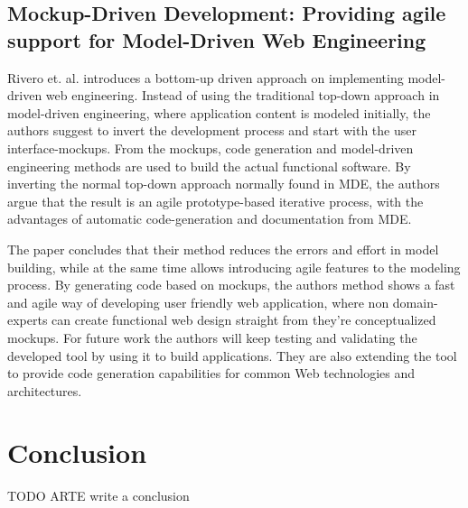 \documentclass[10pt, a4paper, twocolumn]{article}
\begin{document}
\subsection{Mockup-Driven Development: Providing agile support for Model-Driven Web Engineering}

Rivero et. al. \cite{RIVERO2014670} introduces a bottom-up driven approach on implementing model-driven web engineering. Instead of using the traditional top-down approach in model-driven engineering, where application content is modeled initially, the authors suggest to invert the development process and start with the user interface-mockups. From the mockups, code generation and model-driven engineering methods are used to build the actual functional software. By inverting the normal top-down approach normally found in MDE, the authors argue that the result is an agile prototype-based iterative process, with the advantages of automatic code-generation and documentation from MDE. 

The paper concludes that their method reduces the errors and effort in model building, while at the same time allows introducing agile features to the modeling process. By generating code based on mockups, the authors method shows a fast and agile way of developing user friendly web application, where non domain-experts can create functional web design straight from they’re conceptualized mockups. For future work the authors will keep testing and validating the developed tool by using it to build applications. They are also extending the tool to provide code generation capabilities for common Web technologies and architectures.


\section{Conclusion}

TODO ARTE write a conclusion %





\end{document}
